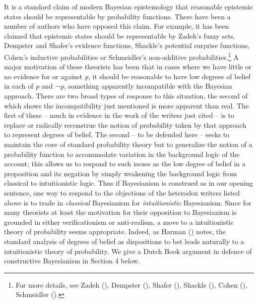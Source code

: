 \documentclass[
  10pt,
  letterpaper,
  DIV=11,
  numbers=noendperiod,
  twoside]{scrartcl}
\begin{document}
It is a standard claim of modern Bayesian epistemology that reasonable
epistemic states should be representable by probability functions. There
have been a number of authors who have opposed this claim. For example,
it has been claimed that epistemic states should be representable by
Zadeh's fuzzy sets, Dempster and Shafer's evidence functions, Shackle's
potential surprise functions, Cohen's inductive probabilities or
Schmeidler's non-additive probabilities.\footnote{For more details, see
  Zadeh (), Dempster
  (), Shafer
  (), Shackle
  (), Cohen
  (), Schmeidler
  ().} A major motivation of these
theorists has been that in cases where we have little or no evidence for
or against \emph{p}, it should be reasonable to have low degrees of
belief in each of \emph{p} and ¬\emph{p}, something apparently
incompatible with the Bayesian approach. There are two broad types of
response to this situation, the second of which shows the
incompatibility just mentioned is more apparent than real. The first of
these -- much in evidence in the work of the writers just cited -- is to
replace or radically reconstrue the notion of probability taken by that
approach to represent degrees of belief. The second -- to be defended
here -- seeks to maintain the core of standard probability theory but to
generalize the notion of a probability function to accommodate variation
in the background logic of the account; this allows us to respond to
such issues as the low degree of belief in a proposition and its
negation by simply weakening the background logic from classical to
intuitionistic logic. Thus if Bayesianism is construed as in our opening
sentence, one way to respond to the objections of the heterodox writers
listed above is to trade in \emph{classical} Bayesianism for
\emph{intuitionistic} Bayesianism. Since for many theorists at least the
motivation for their opposition to Bayesianism is grounded in either
verificationism or anti-realism, a move to a intuitionistic theory of
probability seems appropriate. Indeed, as Harman
() notes, the standard analysis of
degrees of belief as dispositions to bet leads naturally to a
intuitionistic theory of probability. We give a Dutch Book argument in
defence of constructive Bayesianism in Section 4 below.
\end{document}
